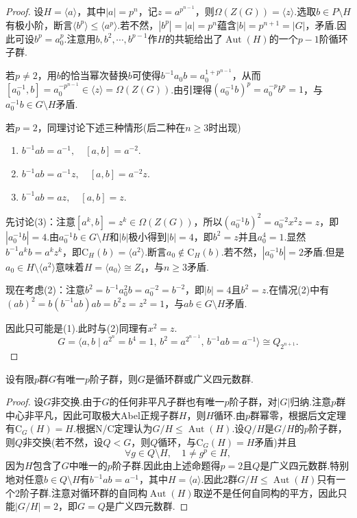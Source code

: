 \begin{proof}
	设$H=\langle a\rangle $，其中$|a|=p^n$，记$z=a^{p^{n-1}}$，则$\Omega(Z(G))=\langle z\rangle $.选取$b\in P\setminus H$有极小阶，断言$\langle b^p\rangle \le\langle a^p\rangle $.若不然，$|b^p|=|a|=p^n$蕴含$|b|=p^{n+1}=|G|$，矛盾.因此可设$b^p=a_0^p$.注意用$b,b^2,\cdots,b^{p-1}$作$H$的共轭给出了$\operatorname*{Aut}(H)$的一个$p-1$阶循环子群.

	若$p\ne 2$，用$b$的恰当幂次替换$b$可使得$b^{-1}a_0b=a_0^{1+p^{n-1}}$，从而$[a_0^{-1},b]=a_0^{-p^{n-1}}\in\langle z\rangle=\Omega(Z(G))$.由引理得$(a_0^{-1}b)^p=a_0^{-p}b^p=1$，与$a_0^{-1}b\in G\setminus H$矛盾.

	若$p=2$，同理讨论下述三种情形(后二种在$n\ge 3$时出现)
	\begin{enumerate}
		\item $b^{-1}ab=a^{-1},\quad[a,b]=a^{-2}$.
		\item $b^{-1}ab=a^{-1}z,\quad[a,b]=a^{-2}z$.
		\item $b^{-1}ab=az,\quad[a,b]=z$.
	\end{enumerate}
	
	先讨论(3)：注意$[a^k,b]=z^k\in\Omega(Z(G))$，所以$(a_0^{-1}b)^2=a_0^{-2}x^2z=z$，即$|a_0^{-1}b|=4$.由$a_0^{-1}b\in G\setminus H$和$|b|$极小得到$|b|=4$，即$b^2=z$并且$a_0^4=1$.显然$b^{-1}a^kb=a^kz^k$，即$\mathrm{C}_H(b)=\langle a^2\rangle$.断言$a_0\notin\mathrm{C}_H(b)$.若不然，$|a_0^{-1}b|=2$矛盾.但是$a_0\in H\setminus\langle a^2\rangle $意味着$H=\langle a_0\rangle\cong Z_4$，与$n\ge 3$矛盾.

	现在考虑(2)：注意$b^2=b^{-1}a_0^2b=a_0^{-2}=b^{-2}$，即$|b|=4$且$b^2=z$.在情况(2)中有$(ab)^2=b(b^{-1}ab)ab=b^2z=z^2=1$，与$ab\in G\setminus H$矛盾.

	因此只可能是(1).此时与(2)同理有$x^2=z$.
	\[
		G=\langle a,b\mid a^{2^n}=b^4=1,\,b^2=a^{2^{n-1}},\,b^{-1}ab=a^{-1}\rangle\cong Q_{2^{n+1}}.
	\]
\end{proof}
\begin{prop}
	设有限$p$群$G$有唯一$p$阶子群，则$G$是循环群或广义四元数群.
\end{prop}
\begin{proof}
	设$G$非交换.由于$G$的任何非平凡子群也有唯一$p$阶子群，对$|G|$归纳.注意$p$群中心非平凡，因此可取极大Abel正规子群$H$，则$H$循环.由$p$群幂零，根据后文定理%
	有$\mathrm{C}_G(H)=H$.根据N/C定理认为$G/H\le\operatorname*{Aut}(H)$.设$Q/H$是$G/H$的$p$阶子群，则$Q$非交换(若不然，设$Q<G$，则$Q$循环，与$\mathrm{C}_G(H)=H$矛盾)并且
	\[
		\forall g\in Q\setminus H,\quad 1\ne g^p\in H,
	\]
	因为$H$包含了$G$中唯一的$p$阶子群.因此由上述命题得$p=2$且$Q$是广义四元数群.特别地对任意$b\in Q\setminus H$有$b^{-1}ab=a^{-1}$，其中$H=\langle a\rangle $.因此$2$群$G/H\le\operatorname*{Aut}(H)$只有一个$2$阶子群.注意对循环群的自同构$\operatorname*{Aut}(H)$取逆不是任何自同构的平方，因此只能$|G/H|=2$，即$G=Q$是广义四元数群.
\end{proof}

